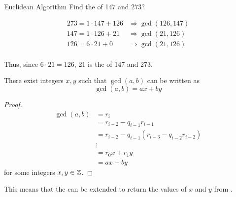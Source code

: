 \begin{example}{Euclidean Algorithm}
  Find the  of 147 and 273?

  \tcblower{}

  \begin{align*}
    273 = 1 \cdot 147 + 126 &\Rightarrow \gcd(126, 147) \\
    147 = 1 \cdot 126 + 21 &\Rightarrow \gcd(21, 126) \\
    126 = 6 \cdot 21 + 0 &\Rightarrow \gcd(21, 126) \\
  \end{align*}

  Thus, since $6 \cdot 21 = 126$, 21 is the  of 147 and 273.
\end{example}

\begin{theorem}
  There exist integers $x, y$ such that $\gcd(a, b)$ can be written as
  \begin{equation}\label{eq:Extended_Euclidean_Algorithm_Basis}
    \gcd(a, b) = ax + by
  \end{equation}
\end{theorem}
\begin{proof}
  \begin{align*}
    \gcd(a, b) &= r_{i} \\
               &= r_{i-2} - q_{i-1}r_{i-1} \\
               &= r_{i-2} - q_{i-1}(r_{i-3} - q_{i-2}r_{i-2}) \\
               &\vdots \\
               &= r_{0}x + r_{1}y \\
               &= ax + by
  \end{align*}
  for some integers $x, y \in \operatorname{\mathbb{Z}}$.
\end{proof}

This means that the  can be extended to return the values of $x$ and $y$ from .

